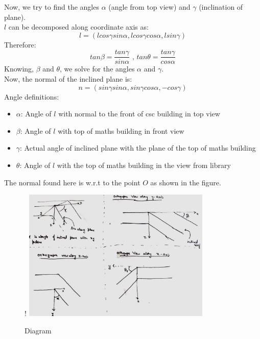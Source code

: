 \documentclass[paper=a4, fontsize=11pt]{scrartcl} %
\begin{document}
Now, we try to find the angles $\alpha$ (angle from top view) and $\gamma$ (inclination of plane).\\
$l$ can be decomposed along coordinate axis as:\\
$$
l = (lcos\gamma sin\alpha , lcos\gamma cos\alpha , lsin\gamma)
$$
Therefore:
$$
tan\beta = \frac{tan\gamma}{sin\alpha} \text{ , }
tan\theta = \frac{tan\gamma}{cos\alpha}
$$
Knowing, $\beta$ and $\theta$, we solve for the angles $\alpha$ and $\gamma$.\\
Now, the normal of the inclined plane is:
$$
    n = (sin\gamma sin\alpha,sin\gamma cos\alpha, -cos\gamma)
$$
Angle definitions:
\begin{itemize}
    \item $\alpha$: Angle of $l$ with normal to the front of csc building in top view
    \item $\beta$: Angle of $l$ with top of maths building in front view
    \item $\gamma$: Actual angle of inclined plane with the plane of the top of maths building
    \item $\theta$: Angle of $l$ with the top of maths building in the view from library
\end{itemize}

The normal found here is w.r.t to the point $O$ as shown in the figure.

\begin{figure}[ht]! 
    \centering
    \includegraphics[width=0.8\textwidth]{figures/diagram.jpg}
    \caption{Diagram}
\end{figure}
\end{document}
